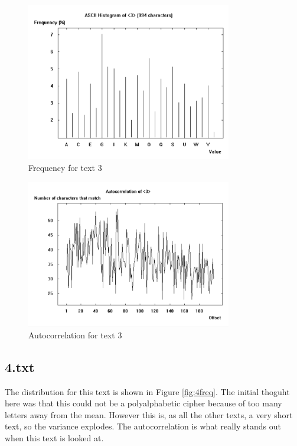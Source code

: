 \begin{figure}[ht!]
    \begin{center}
        \includegraphics[width=0.8\textwidth]{assets/3_frequency.png}
        \caption{Frequency for text 3}
        \label{fig:3freq}
    \end{center}
\end{figure}

\begin{figure}[ht!]
    \begin{center}
        \includegraphics[width=0.8\textwidth]{assets/3_autocorr.png}
        \caption{Autocorrelation for text 3}
        \label{fig:3autocorr}
    \end{center}
\end{figure}

\newpage
\subsection*{4.txt}

The distribution for this text is shown in Figure \ref{fig:4freq}.
The initial thoguht here was that this could not be a polyalphabetic cipher because of too many letters away from the mean.
However this is, as all the other texts, a very short text, so the variance explodes.
The autocorrelation is what really stands out when this text is looked at.

